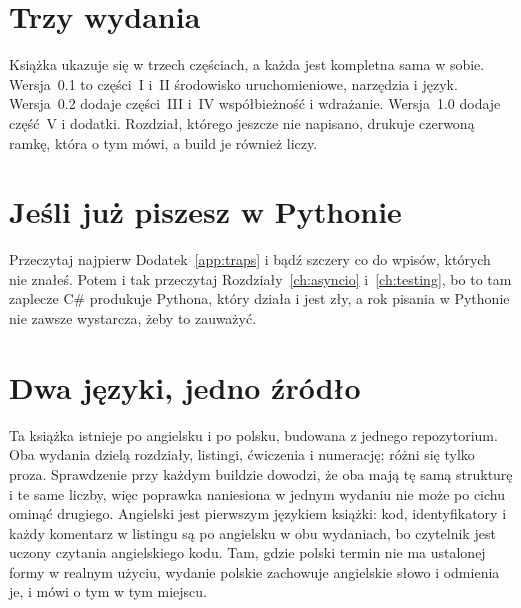 \section*{Trzy wydania}

Książka ukazuje się w trzech częściach, a każda jest kompletna sama w sobie.
Wersja~0.1 to części~I i~II \dash{} środowisko uruchomieniowe, narzędzia i
język. Wersja~0.2 dodaje części~III i~IV \dash{} współbieżność i wdrażanie.
Wersja~1.0 dodaje część~V i dodatki. Rozdział, którego jeszcze nie
napisano, drukuje czerwoną ramkę, która o tym mówi, a build je również
liczy.

\section*{Jeśli już piszesz w Pythonie}

Przeczytaj najpierw Dodatek~\ref{app:traps} i bądź szczery co do wpisów,
których nie znałeś. Potem i tak przeczytaj Rozdziały~\ref{ch:asyncio}
i~\ref{ch:testing}, bo to tam zaplecze C\# produkuje Pythona, który działa i
jest zły, a rok pisania w Pythonie nie zawsze wystarcza, żeby to zauważyć.

\section*{Dwa języki, jedno źródło}

Ta książka istnieje po angielsku i po polsku, budowana z jednego
repozytorium. Oba wydania dzielą rozdziały, listingi, ćwiczenia i numerację;
różni się tylko proza. Sprawdzenie przy każdym buildzie dowodzi, że oba mają
tę samą strukturę i te same liczby, więc poprawka naniesiona w jednym wydaniu
nie może po cichu ominąć drugiego. Angielski jest pierwszym językiem książki:
kod, identyfikatory i każdy komentarz w listingu są po angielsku w obu
wydaniach, bo czytelnik jest uczony czytania angielskiego kodu. Tam,
gdzie polski termin nie ma ustalonej formy w realnym użyciu, wydanie
polskie zachowuje angielskie słowo i odmienia je, i mówi o tym w tym
miejscu.
